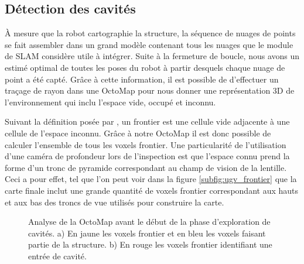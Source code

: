 \subsection{Détection des cavités}

À mesure que la robot cartographie la structure, la séquence de nuages de points se fait assembler dans un grand modèle contenant tous les nuages que le module de SLAM considère utile à intégrer. Suite à la fermeture de boucle, nous avons un estimé optimal de toutes les poses du robot à partir desquels chaque nuage de point a été capté. Grâce à cette information, il est possible de d'effectuer un traçage de rayon dans une OctoMap \citep{Hornung2013} pour nous donner une représentation 3D de l'environnement qui inclu l'espace vide, occupé et inconnu.

Suivant la définition posée par \citep{Yamauchi1997}, un frontier est une cellule vide adjacente à une cellule de l'espace inconnu. Grâce à notre OctoMap il est donc possible de calculer l'ensemble de tous les voxels frontier. Une particularité de l'utilisation d'une caméra de profondeur lors de l'inspection est que l'espace connu prend la forme d'un tronc de pyramide correspondant au champ de vision de la lentille. Ceci a pour effet, tel que l'on peut voir dans la figure \ref{subfig:ugv_frontier} que la carte finale inclut une grande quantité de voxels frontier correspondant aux hauts et aux bas des troncs de vue utilisés pour construire la carte.

\begin{figure}[ht]
  \centering
  \hfil
  \caption{
    Analyse de la OctoMap avant le début de la phase d'exploration de cavités.
    a) En jaune les voxels frontier et en bleu les voxels faisant partie de la structure.
    b) En rouge les voxels frontier identifiant une entrée de cavité.
  }
  \label{fig:ugv_frontier}
\end{figure}

